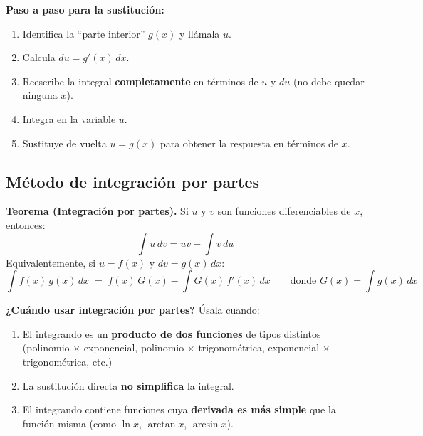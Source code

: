 \documentclass[12pt, letterpaper]{article}
\newcommand{\dx}{\,dx}
\newcommand{\du}{\,du}
\newcommand{\dv}{\,dv}
\begin{document}
\begin{cuadroinfo}
\small\textbf{Paso a paso para la sustitución:}
\begin{enumerate}[leftmargin=*, itemsep=2pt]
  \item Identifica la ``parte interior'' $g(x)$ y llámala $u$.
  \item Calcula $du = g'(x)\dx$.
  \item Reescribe la integral \textbf{completamente} en términos de $u$ y $du$
        (no debe quedar ninguna $x$).
  \item Integra en la variable $u$.
  \item Sustituye de vuelta $u = g(x)$ para obtener la respuesta en términos de $x$.
\end{enumerate}
\end{cuadroinfo}

\vspace{8pt}

\subsection{Método de integración por partes}

\begin{cuadrosolucion}
\textbf{Teorema (Integración por partes).}\quad
Si $u$ y $v$ son funciones diferenciables de $x$, entonces:
\[
  \boxed{\int u\dv = uv - \int v\du}
\]
Equivalentemente, si $u = f(x)$ y $dv = g(x)\dx$:
\[
  \int f(x)\,g(x)\dx \;=\; f(x)\,G(x) - \int G(x)\,f'(x)\dx
  \qquad\text{donde } G(x) = \int g(x)\dx
\]
\end{cuadrosolucion}

\vspace{4pt}

\begin{cuadroadvertencia}
\small\textbf{¿Cuándo usar integración por partes?}\; Úsala cuando:
\begin{enumerate}[leftmargin=*, itemsep=3pt]
  \item El integrando es un \textbf{producto de dos funciones} de tipos distintos
        (polinomio $\times$ exponencial, polinomio $\times$ trigonométrica,
        exponencial $\times$ trigonométrica, etc.)
  \item La sustitución directa \textbf{no simplifica} la integral.
  \item El integrando contiene funciones cuya \textbf{derivada es más simple} que la función
        misma (como $\ln x$, $\arctan x$, $\arcsin x$).
\end{enumerate}
\end{cuadroadvertencia}
\end{document}
